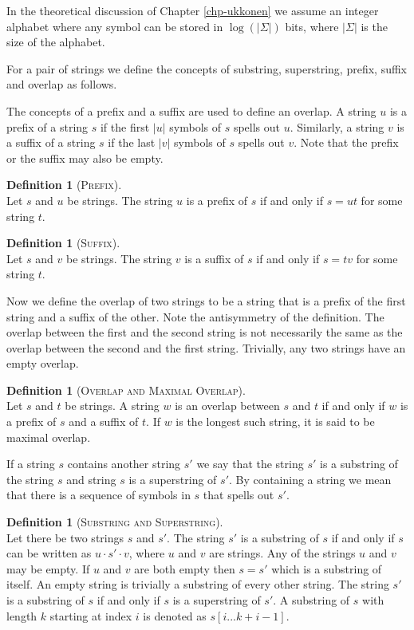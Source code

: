 \documentclass[english,twoside,censored,csm,algorithms-track-2020]{HYthesisML}
\theoremstyle{plain}
\theoremstyle{definition}
\newtheorem{definition}[theorem]{Definition}
\begin{document}
In the theoretical discussion of Chapter \ref{chp-ukkonen} we assume an integer alphabet
where any symbol can be stored in $\log (|\Sigma|)$ bits, where $|\Sigma|$ is the size of the alphabet.

For a pair of strings we define the concepts of substring, superstring, prefix, suffix and overlap
as follows.

The concepts of a prefix and a suffix are used to define an overlap. 
A string $u$ is a prefix of a string $s$ if the first $|u|$ symbols of $s$ spells out $u$.
Similarly, a string $v$ is a suffix of a string $s$ if the last $|v|$ symbols of $s$ spells out $v$.
Note that the prefix or the suffix may also be empty.

\begin{definition}[\textsc{Prefix}]~\label{def-prefix}\\
  Let $s$ and $u$ be strings. The string $u$ is a prefix of $s$ if and only if
  $s = ut$ for some string $t$.
\end{definition}

\begin{definition}[\textsc{Suffix}]~\label{def-suffix}\\
  Let $s$ and $v$ be strings. The string $v$ is a suffix of $s$ if and only if
  $s = tv$ for some string $t$. 
\end{definition}

Now we define the overlap of two strings to be a string that is a prefix of the first string
and a suffix of the other. Note the antisymmetry of the definition. The overlap between the first
and the second string is not necessarily the same as the overlap between the second and the first
string. Trivially, any two strings have an empty overlap.

\begin{definition}[\textsc{Overlap and Maximal Overlap}]~\label{def-overlap}\\
  Let $s$ and $t$ be strings. A string $w$ is an overlap between $s$ and $t$
  if and only if $w$ is a prefix of $s$ and a suffix of $t$.
  If $w$ is the longest such string, it is said to be maximal overlap.
\end{definition}

If a string $s$ contains another string $s'$ we say that the string $s'$ is a substring of the
string $s$ and string $s$ is a superstring of $s'$. 
By containing a string we mean that there is a sequence of symbols in $s$ that spells out $s'$.

\begin{definition}[\textsc{Substring and Superstring}]~\label{def-sub-super}\\
  Let there be two strings $s$ and $s'$.
  The string $s'$ is a substring of $s$ if and only if $s$ can be written as $u\cdot s'\cdot v$,
  where $u$ and $v$ are strings. Any of the strings $u$ and $v$ may be empty.
  If $u$ and $v$ are both empty then $s = s'$ which is a substring of itself.
  An empty string is trivially a substring of every other string.
  The string $s'$ is a substring of $s$ if and only if $s$ is a superstring of $s'$.
  A substring of $s$ with length $k$ starting at index $i$ is denoted
  as $s[i...k+i-1]$.
\end{definition}
\end{document}
